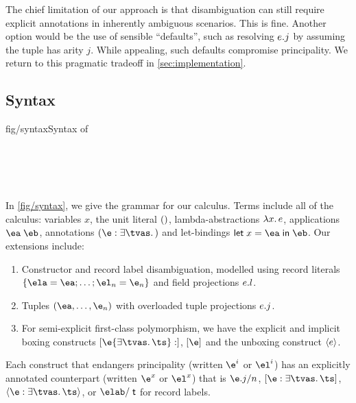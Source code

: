 \documentclass[acmsmall,screen,nonacm]{acmart}
\begin{document}

The chief limitation of our approach is that disambiguation can still
require explicit annotations in inherently ambiguous scenarios.  This is
fine. Another option would be the use of sensible ``defaults'', such as
resolving $e.j$ by assuming the tuple has arity $j$. While
appealing, such defaults compromise principality. We return to this
pragmatic tradeoff in \cref{sec:implementation}.

\subsection{Syntax}

\begin{bnffig}{fig/syntax}{Syntax of \OML}
\\
\\[1ex]
\entry[Types]{\t}{
   \tv \and
   1 \and
   \tya \to \tyb \and
   \tys \T \and
   \Pi \iton \ti \and
   \tpoly \ts
}\\
\\
\\
\end{bnffig}


In \cref {fig/syntax}, we give the grammar for our calculus. Terms include
all of the \ML calculus: variables $x$, the unit literal $()$,
lambda-abstractions $\lambda x. \, e$, applications $\eapp \eone \etwo$,
annotations $\eannot \e \tvs \t$ and let-bindings $\elet x \eone \etwo$.
Our extensions include:
\begin{enumerate}
\item
  Constructor and record label disambiguation, modelled using record
  literals $\erecord { \ela = \eone; \ldots; \el_n = \en }$ and field
  projections $e.l$.

\item
  Tuples $(\eone, \ldots, \en)$ with overloaded tuple projections
  $e.j$.

\item
  For semi-explicit first-class polymorphism, we have the explicit and
    implicit boxing constructs
    $\expoly \e {\exi \tvs \ts}$, $\epoly \e$  and the unboxing construct $\einst e$.

\end{enumerate}
Each construct that endangers principality (written $\e^i$ or $\el^i$) has an
explicitly annotated counterpart (written $\e^x$ or $\el^x$) that is
$\eproj [n] \e j$, $\epoly [\exi \tvs \ts]
\e$, $\einst [\exi \tvs \ts] \e$, or $\elab / \T$ for record labels.
\end{document}

